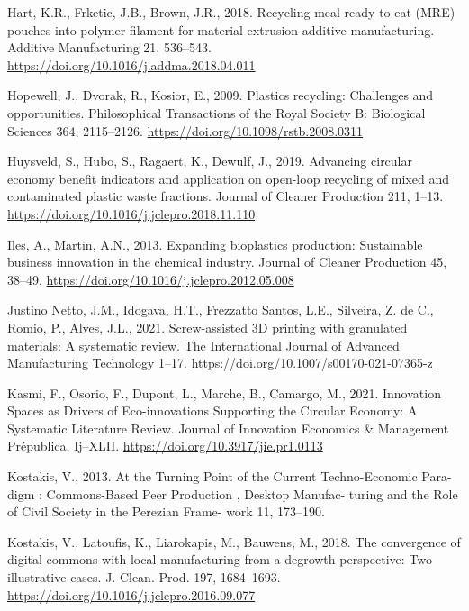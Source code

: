 \documentclass[]{elsarticle} %
\newlength{\cslhangindent}
\newlength{\cslentryspacingunit} %
\newenvironment{CSLReferences}[2] %
 {%
  \setlength{\parindent}{0pt}
  \ifodd #1
  \let\oldpar\par
  \def\par{\hangindent=\cslhangindent\oldpar}
  \fi
  \setlength{\parskip}{#2\cslentryspacingunit}
 }%
 {}
\begin{document}
\begin{CSLReferences}{1}{0}
\leavevmode{}%
Hart, K.R., Frketic, J.B., Brown, J.R., 2018. Recycling meal-ready-to-eat ({MRE}) pouches into polymer filament for material extrusion additive manufacturing. Additive Manufacturing 21, 536--543. \url{https://doi.org/10.1016/j.addma.2018.04.011}

\leavevmode{}%
Hopewell, J., Dvorak, R., Kosior, E., 2009. Plastics recycling: Challenges and opportunities. Philosophical Transactions of the Royal Society B: Biological Sciences 364, 2115--2126. \url{https://doi.org/10.1098/rstb.2008.0311}

\leavevmode{}%
Huysveld, S., Hubo, S., Ragaert, K., Dewulf, J., 2019. Advancing circular economy benefit indicators and application on open-loop recycling of mixed and contaminated plastic waste fractions. Journal of Cleaner Production 211, 1--13. \url{https://doi.org/10.1016/j.jclepro.2018.11.110}

\leavevmode{}%
Iles, A., Martin, A.N., 2013. Expanding bioplastics production: Sustainable business innovation in the chemical industry. Journal of Cleaner Production 45, 38--49. \url{https://doi.org/10.1016/j.jclepro.2012.05.008}

\leavevmode{}%
Justino Netto, J.M., Idogava, H.T., Frezzatto Santos, L.E., Silveira, Z. de C., Romio, P., Alves, J.L., 2021. Screw-assisted {3D} printing with granulated materials: A systematic review. The International Journal of Advanced Manufacturing Technology 1--17. \url{https://doi.org/10.1007/s00170-021-07365-z}

\leavevmode{}%
Kasmi, F., Osorio, F., Dupont, L., Marche, B., Camargo, M., 2021. Innovation {Spaces} as {Drivers} of {Eco-innovations Supporting} the {Circular Economy}: {A Systematic Literature Review}. Journal of Innovation Economics \& Management Prépublica, Ij--XLII. \url{https://doi.org/10.3917/jie.pr1.0113}

\leavevmode{}%
Kostakis, V., 2013. At the {Turning Point} of the {Current Techno-Economic Para-} digm : {Commons-Based Peer Production} , {Desktop Manufac-} turing and the {Role} of {Civil Society} in the {Perezian Frame-} work 11, 173--190.

\leavevmode{}%
Kostakis, V., Latoufis, K., Liarokapis, M., Bauwens, M., 2018. The convergence of digital commons with local manufacturing from a degrowth perspective: {Two} illustrative cases. J. Clean. Prod. 197, 1684--1693. \url{https://doi.org/10.1016/j.jclepro.2016.09.077}


\end{CSLReferences}
\end{document}
